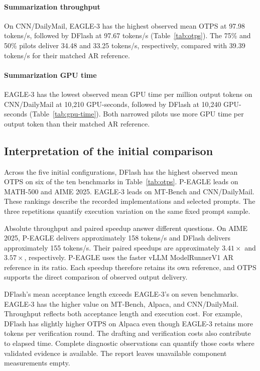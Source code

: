 \documentclass[conference,onecolumn]{IEEEtran}
\begin{document}
\paragraph*{Summarization throughput}
On CNN/DailyMail, EAGLE-3 has the highest observed mean OTPS at 97.98 tokens/s, followed by DFlash at 97.67 tokens/s (Table~\ref{tab:otps}). The 75\% and 50\% pilots deliver 34.48 and 33.25 tokens/s, respectively, compared with 39.39 tokens/s for their matched AR reference.

\paragraph*{Summarization GPU time}
EAGLE-3 has the lowest observed mean GPU time per million output tokens on CNN/DailyMail at 10{,}210 GPU-seconds, followed by DFlash at 10{,}240 GPU-seconds (Table~\ref{tab:gpu-time}). Both narrowed pilots use more GPU time per output token than their matched AR reference.

\subsection{Interpretation of the initial comparison}
Across the five initial configurations, DFlash has the highest observed mean OTPS on six of the ten benchmarks in Table~\ref{tab:otps}. P-EAGLE leads on MATH-500 and AIME 2025. EAGLE-3 leads on MT-Bench and CNN/DailyMail. These rankings describe the recorded implementations and selected prompts. The three repetitions quantify execution variation on the same fixed prompt sample.

Absolute throughput and paired speedup answer different questions. On AIME 2025, P-EAGLE delivers approximately 158 tokens/s and DFlash delivers approximately 155 tokens/s. Their paired speedups are approximately $3.41\times$ and $3.57\times$, respectively. P-EAGLE uses the faster vLLM ModelRunnerV1 AR reference in its ratio. Each speedup therefore retains its own reference, and OTPS supports the direct comparison of observed output delivery.

DFlash's mean acceptance length exceeds EAGLE-3's on seven benchmarks. EAGLE-3 has the higher value on MT-Bench, Alpaca, and CNN/DailyMail. Throughput reflects both acceptance length and execution cost. For example, DFlash has slightly higher OTPS on Alpaca even though EAGLE-3 retains more tokens per verification round. The drafting and verification costs also contribute to elapsed time. Complete diagnostic observations can quantify those costs where validated evidence is available. The report leaves unavailable component measurements empty.
\end{document}
